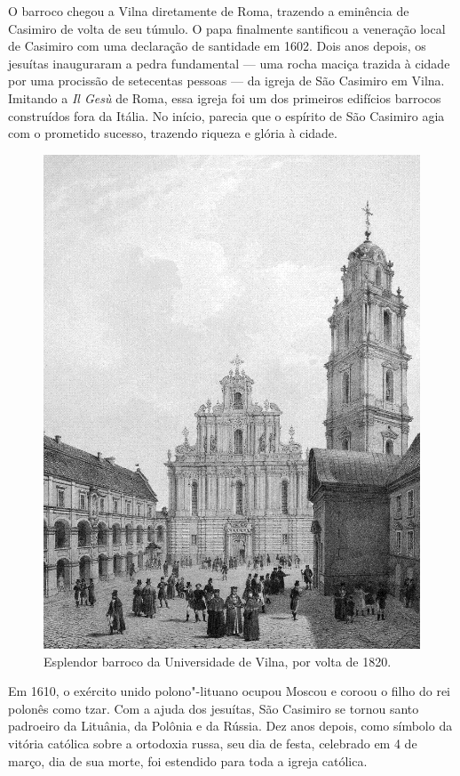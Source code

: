 \asterisc

O barroco chegou a Vilna diretamente de Roma, trazendo a eminência de
Casimiro de volta de seu túmulo. O papa finalmente santificou a
veneração local de Casimiro com uma declaração de santidade em 1602.
Dois anos depois, os jesuítas inauguraram a pedra fundamental --- uma
rocha maciça trazida à cidade por uma procissão de setecentas pessoas ---
da igreja de São Casimiro em Vilna. Imitando a \textit{Il Gesù} de Roma,
essa igreja foi um dos primeiros edifícios barrocos construídos fora da
Itália. No início, parecia que o espírito de São Casimiro agia com o
prometido sucesso, trazendo riqueza e glória à cidade. 

\begin{figure}[!hp]
    \centering
    \includegraphics[width=\textwidth]{ilustra-05.png}
    \caption{Esplendor barroco da Universidade de Vilna, por volta de 1820.}
\end{figure}

Em 1610, o exército unido polono"-lituano ocupou Moscou e coroou o filho do rei
polonês como tzar. Com a ajuda dos jesuítas, São Casimiro se tornou
santo padroeiro da Lituânia, da Polônia e da Rússia. Dez anos depois,
como símbolo da vitória católica sobre a ortodoxia russa, seu dia de
festa, celebrado em 4 de março, dia de sua morte, foi estendido para
toda a igreja católica.


